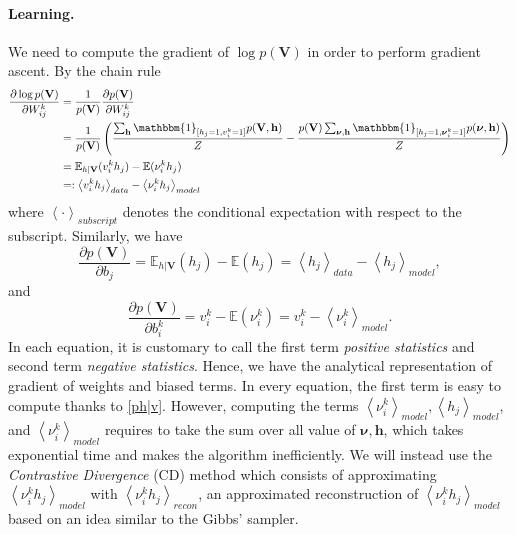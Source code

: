 \documentclass[bj, preprint]{imsart}
\newcommand{\cexp}[1]{\left<#1\right>}
\newcommand{\onebb}{\mathbbm{1}}
\newcommand{\Ebb}{\mathbb{E}}
\begin{document}
\paragraph{Learning.}\label{par:method.models.rbm.learning}

We need to compute the gradient of $\log p(\textbf{V})$ in order to perform gradient ascent. By the chain rule
\begin{align*}
\dfrac{\partial \log p(\textbf{V})}{\partial W_{ij}^{k}} &= \dfrac{1}{p(\textbf{V})} \dfrac{\partial p(\textbf{V})}{\partial W_{ij}^{k}} \\
& = \dfrac{1}{p(\textbf{V})} \left(\dfrac{\sum_{\textbf{h}} \onebb_{[h_j = 1, v_{i}^{k} = 1]} p(\textbf{V}, \textbf{h})}{Z} - \dfrac{p(\textbf{V}) \sum_{\boldsymbol{\nu}, \textbf{h}}\onebb_{[h_j = 1, \boldsymbol{\nu}_{i}^{k} = 1]} p(\boldsymbol{\nu}, \textbf{h})}{Z} \right)\\
& = \Ebb_{h|\textbf{V}}(v_i^k h_j) - \Ebb(\nu_i^k h_j)\\
& =: \cexp{v_i^k h_j}_{data} - \cexp{\nu_i^k h_j}_{model}
\end{align*}
where $\cexp{\cdot}_{subscript}$ denotes the conditional expectation with respect to the subscript. 
Similarly, we have
\begin{equation}
\dfrac{\partial p(\textbf{V})}{\partial b_j}  = \Ebb_{h|\textbf{V}} (h_j) - \Ebb(h_j) =  \cexp{h_j}_{data} - \cexp{h_j}_{model},
\end{equation}
and 
\begin{equation}
\dfrac{\partial p(\textbf{V})}{\partial b_i^k}  = v_i^k - \Ebb(\nu_i^k) = v_i^k - \cexp{\nu_i^k}_{model}.
\end{equation}
In each equation, it is customary to call the first term \textit{positive statistics} and second term \textit{negative statistics}. Hence, we have the analytical representation of gradient of weights and biased terms. In every equation, the first term is easy to compute thanks to \eqref{ph|v}. However, computing the terms $\cexp{\nu_{i}^{k}}_{model}, \cexp{h_j}_{model}$, and $\cexp{\nu_{i}^{k}}_{model}$ requires to take the sum over all value of $\boldsymbol{\nu}, \textbf{h}$, which takes exponential time and makes the algorithm inefficiently. We will instead use the \textit{Contrastive Divergence} (CD) method \citep{hinton2012practical} which consists of approximating $\cexp{\nu_i^k h_j}_{model}$ with $\cexp{\nu_i^k h_j}_{recon}$, an approximated reconstruction of $\cexp{\nu_i^k h_j}_{model}$ based on an idea similar to the Gibbs' sampler.
\end{document}
